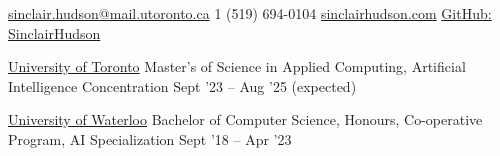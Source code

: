 \documentclass[10pt,a4paper]{article} %
\begin{document}
 



\noindent\href{mailto:sinclair.hudson@mail.utoronto.ca}{sinclair.hudson@mail.utoronto.ca}\bull %
\textsmaller{+}1 (519) 694-0104 \bull %
\href{http://www.sinclairhudson.com}{sinclairhudson.com} \bull
\href{https://github.com/SinclairHudson}{GitHub: SinclairHudson}

\spacedhrule{0.4em}{-0.4em} %

\headedsection %
{\href{https://www.utoronto.ca/}{University of Toronto}}
{\textsc{}} {
\headedsubsection %
{Master's of Science in Applied Computing, Artificial Intelligence Concentration}
{Sept '23 -- Aug '25 (expected)}
{}
}

\headedsection %
{\href{https://uwaterloo.ca/}{University of Waterloo}}
{\textsc{}} {
\headedsubsection %
{Bachelor of Computer Science, Honours, Co-operative Program, AI Specialization}
{Sept '18 -- Apr '23}
{}
}
\spacedhrule{0.4em}{-0.4em} %
\end{document}
